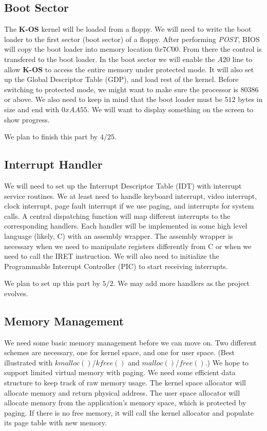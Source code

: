 \documentclass[dvips,11pt]{article}
\begin{document}
\subsection{\textbf{Boot Sector}}
The {\bf K-OS} kernel will be loaded from a floppy. We will need to
write the boot loader to the first sector (boot sector) of a
floppy. After performing {\it POST}, BIOS will copy the boot loader
into memory location $0x7C00$. From there the control is transfered to
the boot loader. In the boot sector we will enable the $A20$ line to
allow {\bf K-OS} to access the entire memory under protected mode. It
will also set up the Global Descriptor Table (GDP), and load rest of
the kernel. Before switching to protected mode, we might want to make
sure the processor is $80386$ or above. We also need to keep in mind
that the boot loader must be $512$ bytes in size and end with
$0xAA55$. We will want to display something on the screen to show
progress. 

We plan to finish this part by $4/25$.


\subsection{\textbf{Interrupt Handler}}
We will need to set up the Interrupt Descriptor Table (IDT) with
interrupt service routines. We at least need to handle keyboard
interrupt, video interrupt, clock interrupt, page fault interrupt if
we use paging, and interrupts for system
calls. A central dispatching function will map different interrupts to
the corresponding handlers. Each handler will be implemented in some
high level language (likely, C) with an assembly wrapper. The assembly
wrapper is necessary when we need to manipulate registers differently
from C or when we need to call the IRET instruction. We will also need
to initialize the Programmable Interrupt Controller (PIC) to start
receiving interrupts. 

We plan to set up this part by $5/2$. We may add more handlers as the
project evolves.


\subsection{\textbf{Memory Management}}
We need some basic memory management before we can move on. Two
different schemes are necessary, one for kernel space, and one for
user space. (Best illustrated with $kmalloc()$/$kfree()$ and
$malloc()$/$free()$.) We hope to support limited virtual memory with
paging. We need some efficient data structure to keep track of raw
memory usage. The kernel space allocator will allocate memory and
return physical address. The user space allocator will allocate memory
from the application's memory space, which is protected by paging. If
there is no free memory, it will call the kernel allocator and
populate its page table with new memory. 
\end{document}
